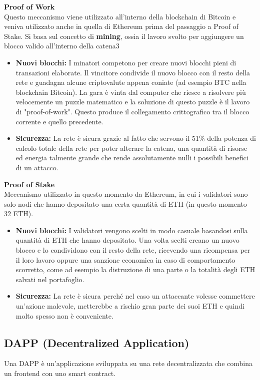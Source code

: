 \textbf{Proof of Work} \\
Questo meccanismo viene utilizzato all'interno della blockchain di Bitcoin e
veniva utilizzato anche in quella di Ethereum prima del passaggio a Proof of
Stake. Si basa sul concetto di \textbf{mining}, ossia il lavoro svolto per
aggiungere un blocco valido all'interno della catena3 
\begin{itemize}
    \item \textbf{Nuovi blocchi:} I minatori competono per creare nuovi
        blocchi pieni di transazioni elaborate. Il vincitore condivide il nuovo
        blocco con il resto della rete e guadagna alcune criptovalute appena
        coniate (ad esempio BTC nella blockchain Bitcoin). La gara è vinta dal
        computer che riesce a risolvere più velocemente un puzzle matematico e
        la soluzione di questo puzzle è il lavoro di "proof-of-work". Questo
        produce il collegamento crittografico tra il blocco corrente e quello
        precedente. 
    \item \textbf{Sicurezza:} La rete è sicura grazie al fatto che servono il
        51\% della potenza di calcolo totale della rete per poter alterare la
        catena, una quantità di risorse ed energia talmente grande che rende
        assolutamente nulli i possibili benefici di un attacco.
\end{itemize}

\textbf{Proof of Stake} \\
Meccanismo utilizzato in questo momento da Ethereum, in cui i validatori sono
solo nodi che hanno depositato una certa quantità di ETH (in questo momento 32
ETH). 
\begin{itemize}
    \item \textbf{Nuovi blocchi:} I validatori vengono scelti in modo casuale
        basandosi sulla quantità di ETH che hanno depositato. Una volta scelti
        creano un nuovo blocco e lo condividono con il resto della rete,
        ricevendo una ricompensa per il loro lavoro oppure una sanzione
        economica in caso di comportamento scorretto, come ad esempio la
        distruzione di una parte o la totalità degli ETH salvati nel
        portafoglio.
    \item \textbf{Sicurezza:} La rete è sicura perché nel caso un attaccante
        volesse commettere un'azione malevole, metterebbe a rischio gran parte
        dei suoi ETH e quindi molto spesso non è conveniente.
\end{itemize}

\subsection{DAPP (Decentralized Application)}
Una DAPP è un'applicazione sviluppata su una rete decentralizzata che combina 
un frontend con uno smart contract. 


